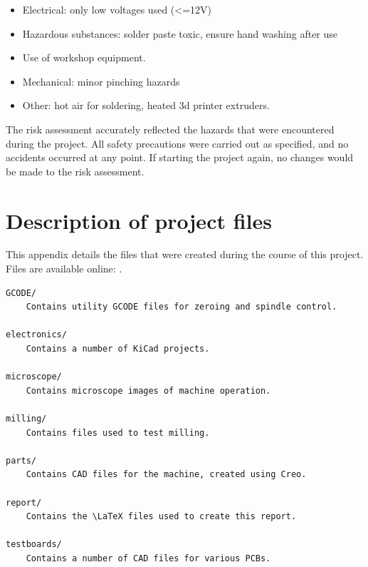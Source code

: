 \begin{itemize}\itemsep0em
\item
Electrical: only low voltages used (<=12V)

\item
Hazardous substances: solder paste toxic, ensure hand washing after use

\item
Use of workshop equipment.

\item
Mechanical: minor pinching hazards

\item
Other: hot air for soldering, heated 3d printer extruders.

\end{itemize}

The risk assessment accurately reflected the hazards that were encountered
during the project. All safety precautions were carried out as specified,
and no accidents occurred at any point. If starting the project again, no
changes would be made to the risk assessment.

\newpage
\section{Description of project files}
This appendix details the files that were created during the course
of this project. Files are available online: \cite{solderingmachine}.

\begin{lstlisting}[frame=single]
GCODE/	
	Contains utility GCODE files for zeroing and spindle control.

electronics/
	Contains a number of KiCad projects.
	
microscope/	
	Contains microscope images of machine operation.
	
milling/
	Contains files used to test milling.

parts/
	Contains CAD files for the machine, created using Creo.
	
report/
	Contains the \LaTeX files used to create this report.
	
testboards/
	Contains a number of CAD files for various PCBs.
\end{lstlisting}



\newpage
\printglossaries

\nocite{*}
\printbibliography


